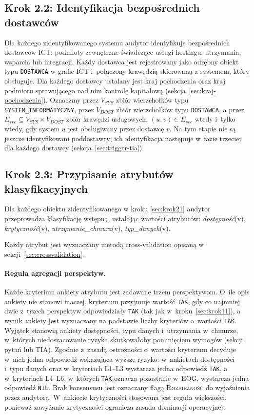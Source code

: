 \subsection{Krok 2.2: Identyfikacja bezpośrednich dostawców}
\label{sec:krok22}

Dla każdego zidentyfikowanego systemu audytor identyfikuje bezpośrednich dostawców ICT: podmioty zewnętrzne świadczące
usługi hostingu, utrzymania, wsparcia lub integracji.
Każdy dostawca jest rejestrowany jako odrębny obiekt typu \texttt{DOSTAWCA} w grafie ICT i~połączony krawędzią skierowaną z systemem, który obsługuje. Dla każdego dostawcy ustalany jest kraj pochodzenia oraz kraj podmiotu sprawującego nad nim kontrolę kapitałową (sekcja~\ref{sec:kraj-pochodzenia}). Oznaczmy przez $V_{SYS}$ zbiór wierzchołków typu \texttt{SYSTEM\_INFORMATYCZNY}, przez $V_{DOST}$ zbiór wierzchołków typu \texttt{DOSTAWCA}, a przez $E_{svc} \subseteq V_{SYS} \times V_{DOST}$ zbiór krawędzi usługowych: $(u, v) \in E_{svc}$ wtedy i~tylko wtedy, gdy system $u$ jest obsługiwany przez dostawcę $v$. Na tym etapie nie są jeszcze identyfikowani poddostawcy; ich identyfikacja następuje w~fazie trzeciej dla każdego dostawcy (sekcja~\ref{sec:trigger-tia}).

\subsection{Krok 2.3: Przypisanie atrybutów klasyfikacyjnych}
\label{sec:krok23}

Dla każdego obiektu zidentyfikowanego w kroku \ref{sec:krok21} audytor przeprowadza klasyfikację wstępną, ustalając wartości atrybutów:
\textit{dostępność}(v),
\textit{krytyczność}(v),
\textit{utrzymanie\_chmura}(v),
\textit{typ\_danych}(v).


Każdy atrybut jest wyznaczany metodą cross-validation opisaną w sekcji~\ref{sec:crossvalidation}.

\paragraph{Reguła agregacji perspektyw.}
Każde kryterium ankiety atrybutu jest zadawane trzem perspektywom. O~ile opis ankiety nie stanowi inaczej, kryterium przyjmuje wartość \texttt{TAK}, gdy co najmniej dwie z~trzech perspektyw odpowiedziały \texttt{TAK} (tak jak w~kroku~\ref{sec:krok11}), a wynik ankiety jest wyznaczany na podstawie liczby kryteriów o~wartości \texttt{TAK}.
Wyjątek stanowią ankiety dostępności, typu danych i~utrzymania w~chmurze, w~których niedoszacowanie ryzyka skutkowałoby pominięciem wymogów (sekcji pytań lub TIA). Zgodnie z~zasadą ostrożności o~wartości kryterium decyduje w~nich jedna odpowiedź wskazująca wyższe ryzyko: w~ankietach dostępności i~typu danych oraz w~kryteriach L1--L3 wystarcza jedna odpowiedź \texttt{TAK}, a w~kryteriach L4--L6, w~których \texttt{TAK} oznacza pozostanie w~EOG, wystarcza jedna odpowiedź \texttt{NIE}. Brak konsensusu jest oznaczany flagą \textsc{Rozbieżność} do wyjaśnienia przez audytora. W~ankiecie krytyczności stosowana jest reguła większości, ponieważ zawyżanie krytyczności ogranicza zasada dominacji operacyjnej.


